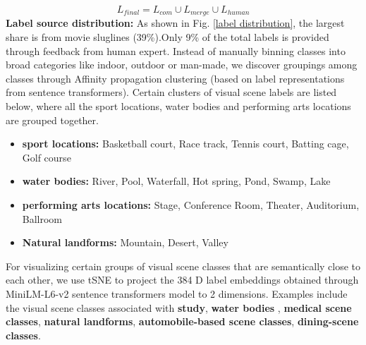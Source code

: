 \begin{equation}
     L_{final}=L_{com}\cup L_{merge} \cup L_{human}
\end{equation}
\textbf{Label source distribution:} As shown in Fig. \ref{label distribution}, the largest share is from movie sluglines (39\%).Only 9\% of the total labels is provided through feedback from human expert. Instead of manually binning classes into broad categories like indoor, outdoor or man-made, we discover groupings among classes through Affinity propagation clustering \cite{brendanfrey}  (based on label representations from sentence transformers). Certain clusters of visual scene labels are listed below, where all the sport locations, water bodies and performing arts locations are grouped together.
\begin{itemize}
    \item \textbf{sport locations:} Basketball court, Race track, Tennis court, Batting cage, Golf course
    \item \textbf{water bodies:} River, Pool, Waterfall, Hot spring, Pond, Swamp, Lake
    \item \textbf{performing arts locations:} Stage, Conference Room, Theater, Auditorium, Ballroom
    \item \textbf{Natural landforms:} Mountain, Desert, Valley
\end{itemize}
For visualizing certain groups of visual scene classes that are semantically close to each other, we use tSNE \cite{tSNE} to project the 384 D label embeddings obtained through MiniLM-L6-v2 sentence transformers model \cite{reimers-2019-sentence-bert} to 2 dimensions. Examples include the visual scene classes associated with \textbf{study}, \textbf{water bodies} , \textbf{medical scene classes}, \textbf{natural landforms}, \textbf{automobile-based scene classes}, \textbf{dining-scene classes}.
